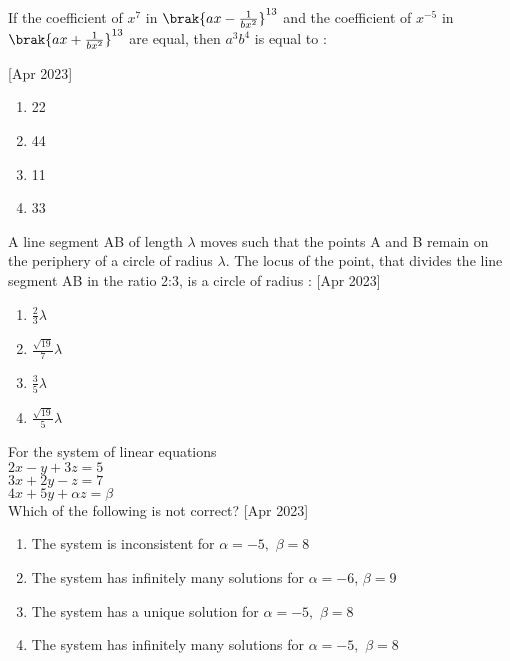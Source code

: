     \item If the coefficient of  $x^7$ in $\brak{ax-\frac{1}{bx^2}}^{13}$ and the coefficient of $x^{-5}$ in $\brak{ax+\frac{1}{bx^2}}^{13}$ are equal, then $a^3b^4$ is equal to :
\begin{multicols}{1}
 \hfill{[Apr 2023]}
            \begin{enumerate}
              \item 22
              \item  44
              \item  11
              \item 33
            \end{enumerate}
        \end{multicols}
    \item A line segment AB of length $\lambda$ moves such that the points A and B remain on the periphery of a circle of radius $\lambda$. The locus of the point, that divides the line segment AB in the ratio 2:3, is a circle of radius :
     \hfill{[Apr 2023]}
    \begin{multicols}{1}
            \begin{enumerate}
              \item $\frac{2}{3}\lambda$
              \item   $\frac{\sqrt{19}}{7}\lambda$
              \item   $\frac{3}{5}\lambda$
              \item  $\frac{\sqrt{19}}{5}\lambda$
            \end{enumerate}
        \end{multicols}
    \item For the system of linear equations \\
    $2x-y+3z=5$\\
    $3x+2y-z=7$\\
    $4x+5y+\alpha z=\beta$\\
    Which of the following is not correct?
     \hfill{[Apr 2023]}
    \begin{multicols}{1}
            \begin{enumerate}
              \item The system is inconsistent for $\alpha =-5,$ $\beta = 8$
              \item The system has infinitely many solutions for $\alpha =-6$, $\beta = 9$
              \item The system has a unique solution  for $\alpha =-5,$ $\beta = 8$
              \item The system has infinitely many solutions for $\alpha =-5,$ $\beta = 8$
            \end{enumerate}
        \end{multicols}

